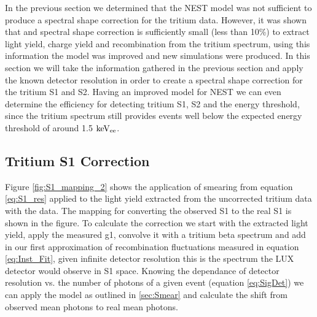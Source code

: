 In the previous section we determined that the NEST model was not sufficient to produce a spectral shape correction for the tritium data. However, it was shown that and spectral shape correction is sufficiently small (less than 10\%) to extract light yield, charge yield and recombination from the tritium spectrum, using this information the model was improved and new simulations were produced. In this section we will take the information gathered in the previous section and apply the known detector resolution in order to create a spectral shape correction for the tritium S1 and S2. Having an improved model for NEST we can even determine the efficiency for  detecting tritium S1, S2 and the energy threshold, since the tritium spectrum still provides events well below the expected energy threshold of around 1.5 $\rm keV_{ee}$.


\subsection{Tritium S1 Correction}

Figure \ref{fig:S1_mapping_2} shows the application of smearing  from equation \ref{eq:S1_res} applied to the light yield extracted from the uncorrected tritium data with the data. The mapping for converting the observed S1 to the real S1 is shown in the figure. To calculate the correction we start with the extracted light yield, apply the measured g1, convolve it with a tritium beta spectrum and add in our first approximation of recombination fluctuations measured in equation \ref{eq:Inst_Fit}, given infinite detector resolution this is the spectrum the LUX detector would observe in S1 space. Knowing the dependance of detector resolution vs. the number of photons of a given event (equation \ref{eq:SigDet}) we can apply the model as outlined in \ref{sec:Smear} and calculate the shift from observed mean photons to real mean photons.

